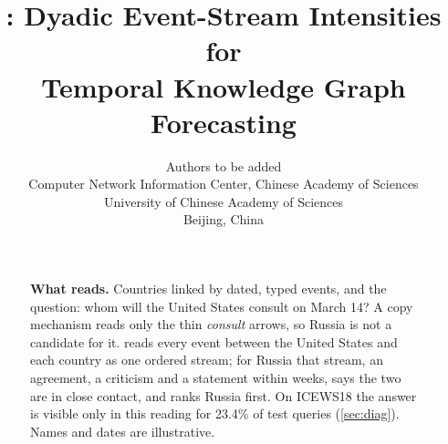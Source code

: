\documentclass[10pt,twocolumn]{article}
\title{\model{}: Dyadic Event-Stream Intensities for\\Temporal Knowledge Graph Forecasting}
\author{%
  Authors to be added\\
  Computer Network Information Center, Chinese Academy of Sciences\\
  University of Chinese Academy of Sciences\\
  Beijing, China
}
\date{}
\begin{document}
\maketitle

\suppressfloats[t]
\begin{figure}[t]
  \centering
  \caption{\textbf{What \model{} reads.} Countries linked by dated, typed events, and the question: whom will the United States consult on March 14? A copy mechanism reads only the thin \emph{consult} arrows, so Russia is not a candidate for it. \model{} reads every event between the United States and each country as one ordered stream; for Russia that stream, an agreement, a criticism and a statement within weeks, says the two are in close contact, and \model{} ranks Russia first. On ICEWS18 the answer is visible only in this reading for 23.4\% of test queries (\cref{sec:diag}). Names and dates are illustrative.}
  \label{fig:intro}
\end{figure}














\end{document}
